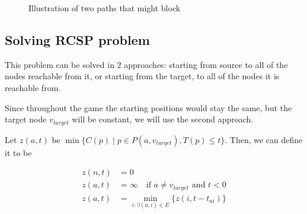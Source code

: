 \documentclass[12pt]{article}
\newcommand*{\target}{\ensuremath{v_{target}}}
\begin{document}
\begin{figure}[H]\centering
    \caption{Illustration of two paths that might block}
\end{figure}


\subsection{Solving RCSP problem}

This problem can be solved in 2 approaches:
starting from source to all of the nodes reachable from it,
or starting from the target, to all of the nodes it is reachable from.

Since throughout the game the starting positions would stay the same,
but the target node $\target$ will be constant, we will use the second approach.

Let $z(a, t)$ be $\min \{ C(p) \mid p \in P(a,\target), T(p) \leq t \}$.
Then, we can define it to be

\begin{align}
    z(n,t) & = 0                                                   \\
    z(a,t) & = \infty \quad \text{if $a \neq \target$ and $t < 0$} \\
    z(a,t) & =
    \min\limits_{i : \exists (a,i) \in E}
    \Big\{
    z(i, t - t_{ai})
    \Big\}
\end{align}
\end{document}
